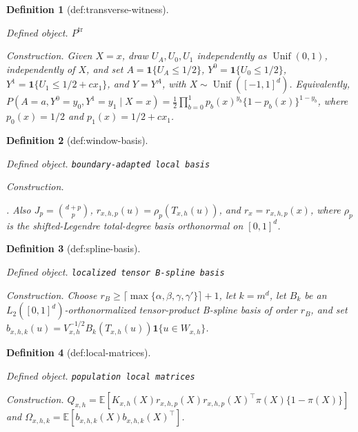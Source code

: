 \documentclass{article}
\newtheorem{definition}{Definition}
\begin{document}
\begin{definition}[def:transverse-witness]\label{def:transverse-witness}
\par\smallskip\noindent\emph{Defined object.} \(P^{\mathrm{tr}}\)
\par\smallskip\noindent\emph{Construction.} Given \(X=x\), draw \(U_A,U_0,U_1\) independently as \(\operatorname{Unif}(0,1)\), independently of \(X\), and set \(A=\mathbf 1\{U_A\le1/2\}\), \(Y^0=\mathbf 1\{U_0\le1/2\}\), \(Y^1=\mathbf 1\{U_1\le1/2+cx_1\}\), and \(Y=Y^A\), with \(X\sim\operatorname{Unif}([-1,1]^d)\). Equivalently, \(P(A=a,Y^0=y_0,Y^1=y_1\mid X=x)=\tfrac12\prod_{b=0}^1p_b(x)^{y_b}\{1-p_b(x)\}^{1-y_b}\), where \(p_0(x)=1/2\) and \(p_1(x)=1/2+cx_1\).
\end{definition}

\begin{definition}[def:window-basis]\label{def:window-basis}
\par\smallskip\noindent\emph{Defined object.} \texttt{boundary-\allowbreak{}adapted local basis}
\par\smallskip\noindent\emph{Construction.} \leavevmode\par\noindent {}\par\noindent. Also \(J_p=\binom{d+p}{p}\), \(r_{x,h,p}(u)=\rho_p(T_{x,h}(u))\), and \(r_x=r_{x,h,p}(x)\), where \(\rho_p\) is the shifted-Legendre total-degree basis orthonormal on \([0,1]^d\).
\end{definition}

\begin{definition}[def:spline-basis]\label{def:spline-basis}
\par\smallskip\noindent\emph{Defined object.} \texttt{localized tensor B-\allowbreak{}spline basis}
\par\smallskip\noindent\emph{Construction.} Choose \(r_B\ge\lceil\max\{\alpha,\beta,\gamma,\gamma'\}\rceil+1\), let \(k=m^d\), let \(B_k\) be an \(L_2([0,1]^d)\)-orthonormalized tensor-product B-spline basis of order \(r_B\), and set \(b_{x,h,k}(u)=V_{x,h}^{-1/2}B_k(T_{x,h}(u))\mathbf 1\{u\in W_{x,h}\}\).
\end{definition}

\begin{definition}[def:local-matrices]\label{def:local-matrices}
\par\smallskip\noindent\emph{Defined object.} \texttt{population local matrices}
\par\smallskip\noindent\emph{Construction.} \(Q_{x,h}=\mathbb E[K_{x,h}(X)r_{x,h,p}(X)r_{x,h,p}(X)^\top\pi(X)\{1-\pi(X)\}]\) and \(\Omega_{x,h,k}=\mathbb E[b_{x,h,k}(X)b_{x,h,k}(X)^\top]\).
\end{definition}
\end{document}
